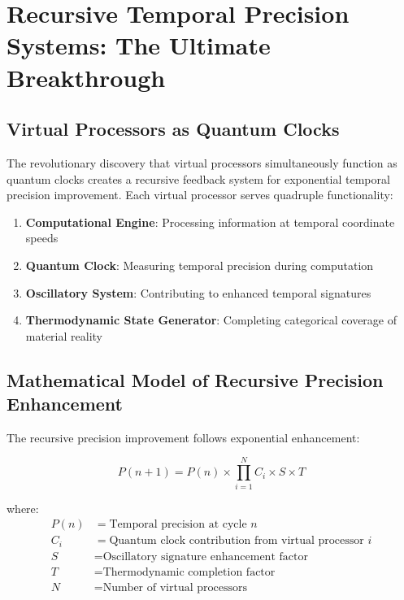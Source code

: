 \documentclass[12pt,a4paper]{article}
\begin{document}
\section{Recursive Temporal Precision Systems: The Ultimate Breakthrough}

\subsection{Virtual Processors as Quantum Clocks}

The revolutionary discovery that virtual processors simultaneously function as quantum clocks creates a recursive feedback system for exponential temporal precision improvement. Each virtual processor serves quadruple functionality:

\begin{enumerate}
\item \textbf{Computational Engine}: Processing information at temporal coordinate speeds
\item \textbf{Quantum Clock}: Measuring temporal precision during computation
\item \textbf{Oscillatory System}: Contributing to enhanced temporal signatures
\item \textbf{Thermodynamic State Generator}: Completing categorical coverage of material reality
\end{enumerate}

\subsection{Mathematical Model of Recursive Precision Enhancement}

The recursive precision improvement follows exponential enhancement:

\begin{equation}
P(n+1) = P(n) \times \prod_{i=1}^{N} C_i \times S \times T
\end{equation}

where:
\begin{align}
P(n) &= \text{Temporal precision at cycle } n \\
C_i &= \text{Quantum clock contribution from virtual processor } i \\
S &= \text{Oscillatory signature enhancement factor} \\
T &= \text{Thermodynamic completion factor} \\
N &= \text{Number of virtual processors}
\end{align}
\end{document}
